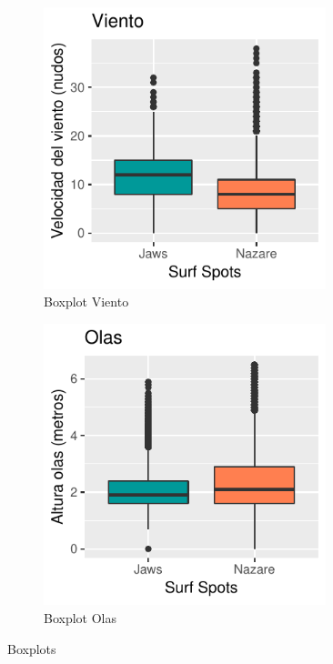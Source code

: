 \begin{figure}[H]
    \begin{subfigure}{.49\textwidth}
        \centering
        \includegraphics[width=0.9\textwidth]{./figures/boxplot_wind.pdf}
        \caption{Boxplot Viento}
        \label{fig:boxplot_wind}
    \end{subfigure}%
    \begin{subfigure}{.49\textwidth}
        \centering
        \includegraphics[width=0.9\textwidth]{./figures/boxplot_wave.pdf}
        \caption{Boxplot Olas}
        \label{fig:boxplot_wave}
    \end{subfigure}
    \caption{Boxplots}
    \label{fig:boxplots}
\end{figure}

